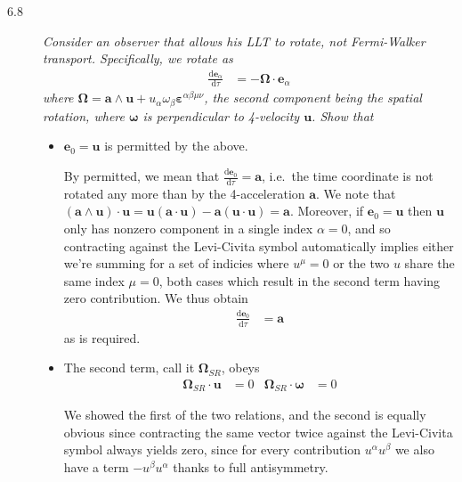 \documentclass[12pt]{report}
\newcommand{\rd}[2]{\frac{\mathrm{d}#1}{\mathrm{d}#2}}
\newcommand{\bm}[1]{\boldsymbol{\mathbf{#1}}}
\begin{document}
\begin{description}
    \item[6.8] {\em Consider an observer that allows his LLT to rotate, not
        Fermi-Walker transport. Specifically, we rotate as
        \begin{align}
            \rd{\bm{e}_\alpha}{\tau} &= -\bm{\Omega} \cdot
            \bm{e}_\alpha
        \end{align}
        where $\bm{\Omega} = \bm{a} \wedge \bm{u} +
        u_\alpha \omega_\beta \bm{\varepsilon}^{\alpha \beta \mu \nu}$, the
        second component being the spatial rotation, where $\bm{\omega}$ is
        perpendicular to 4-velocity $\bm{u}$. Show that\/}
        \begin{itemize}
            \item $\bm{e}_0 = \bm{u}$ is permitted by the above.

                By permitted, we mean that $\rd{\bm{e}_0}{\tau} =
                \bm{a}$, i.e.\ the time coordinate is not rotated any more
                than by the 4-acceleration $\bm{a}$. We note that
                $(\bm{a} \wedge \bm{u}) \cdot \bm{u} = \bm{u}
                (\bm{a} \cdot \bm{u}) - \bm{a}(\bm{u} \cdot
                \bm{u}) = \bm{a}$. Moreover, if $\bm{e}_0 =
                \bm{u}$ then $\bm{u}$ only has nonzero component in a
                single index $\alpha = 0$, and so contracting against the
                Levi-Civita symbol automatically implies either we're summing
                for a set of indicies where $u^\mu = 0$ or the two $u$ share the
                same index $\mu = 0$, both cases which result in the second term
                having zero contribution. We thus obtain
                \begin{align*}
                    \rd{\bm{e}_0}{\tau} &= \bm{a}
                \end{align*}
                as is required.

            \item The second term, call it $\bm{\Omega}_{SR}$, obeys
                \begin{align*}
                    \bm{\Omega}_{SR} \cdot \bm{u} &= 0 &
                    \bm{\Omega}_{SR} \cdot \bm{\omega} &= 0
                \end{align*}

                We showed the first of the two relations, and the second is
                equally obvious since contracting the same vector twice against
                the Levi-Civita symbol always yields zero, since for every
                contribution $u^\alpha u^\beta$ we also have a term $-u^\beta
                u^\alpha$ thanks to full antisymmetry.


\end{itemize}
\end{description}
\end{document}
